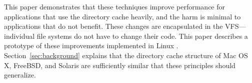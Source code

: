This paper demonstrates that these techniques improve performance for applications that use the directory cache heavily,
and the harm is minimal to applications that do not benefit.
These changes are encapsulated in the VFS---individual file systems do not have to change their code.
This paper describes a  prototype of these improvements implemented in Linux \linuxver{}.
Section~\ref{sec:background} explains that the directory cache structure of Mac OS X, FreeBSD, and Solaris 
are sufficiently similar that these principles should generalize.





